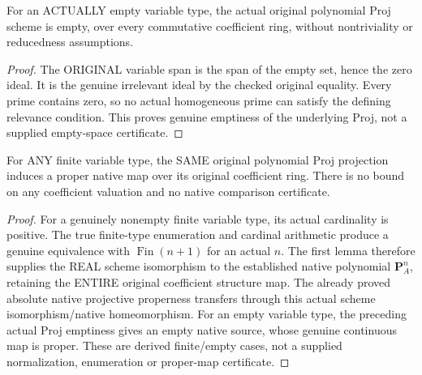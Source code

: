 \begin{lemma}
\label{scheme:actual-polynomial-proj-empty-index}
\leanok
{}
For an ACTUALLY empty variable type, the actual original polynomial Proj scheme
is empty, over every commutative coefficient ring, without nontriviality or
reducedness assumptions.
\end{lemma}
\begin{proof}
The ORIGINAL variable span is the span of the empty set, hence the zero ideal.
It is the genuine irrelevant ideal by the checked original equality. Every
prime contains zero, so no actual homogeneous prime can satisfy the defining
relevance condition. This proves genuine emptiness of the underlying Proj,
not a supplied empty-space certificate.
\end{proof}

\begin{theorem}
\label{scheme:finite-polynomial-proj-native-proper}
\leanok
{}
For ANY finite variable type, the SAME original polynomial Proj projection
induces a proper native map over its original coefficient ring. There is no
bound on any coefficient valuation and no native comparison certificate.
\end{theorem}
\begin{proof}
For a genuinely nonempty finite variable type, its actual cardinality is positive.
The true finite-type enumeration and cardinal arithmetic produce a genuine
equivalence with $\operatorname{Fin}(n+1)$ for an actual $n$. The first lemma
therefore supplies the REAL scheme isomorphism to the established native
polynomial $\mathbf P^n_A$, retaining the ENTIRE original coefficient structure
map. The already proved absolute native projective properness transfers through
this actual scheme isomorphism/native homeomorphism. For an empty variable type,
the preceding actual Proj emptiness gives an empty native source, whose genuine
continuous map is proper. These are derived finite/empty cases, not a supplied
normalization, enumeration or proper-map certificate.
\end{proof}


